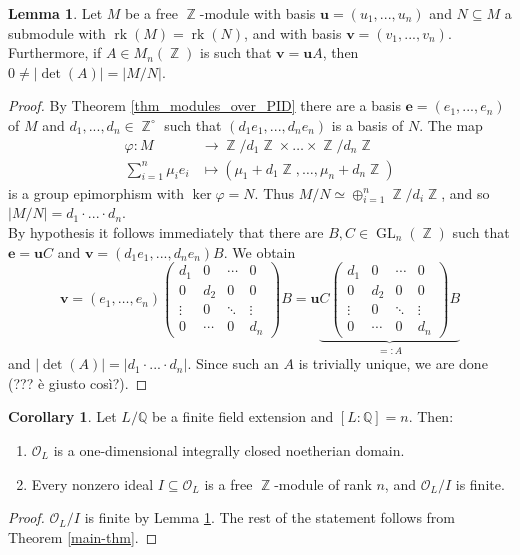 \documentclass[12pt,a4paper]{report}
\theoremstyle{definition}
\newtheorem{corollary}[theorem]{Corollary} %
\newtheorem{lemma}[theorem]{Lemma}
\theoremstyle{num.custom-title}
\DeclareMathOperator{\rk}{rk}
\DeclareMathOperator{\Z}{\mathbb{Z}}
\DeclareMathOperator{\sse}{\subseteq}
\DeclareMathOperator{\GL}{GL}
\newcommand{\Q}{\mathbb{Q}}
\renewcommand{\phi}{\varphi}
\renewcommand{\O}{\mathcal{O}}
\renewcommand{\u}{\mathbf{u}}
\begin{document}
\begin{lemma}\label{lemma_card_fact-mod}
Let $M$ be a free $\Z$-module with basis $\u = (u_1,...,u_n)$ and $N \sse M$ a submodule with $\rk(M) = \rk(N)$, and with basis $\mathbf{v} = (v_1,...,v_n)$. Furthermore, if $A \in M_n(\Z)$ is such that $\mathbf{v} = \u A$, then $0 \neq |\det(A)| = |M/N|$.
\begin{proof}
By Theorem \ref{thm_modules_over_PID} there are a basis $\mathbf{e} = (e_1,...,e_n)$ of $M$ and $d_1,...,d_n \in \Z^\circ$ such that $(d_1 e_1,...,d_n e_n)$ is a basis of $N$. The map
\begin{align*}
\phi \colon M &\to \Z/d_1\Z \times \ldots \times \Z/d_n\Z \\
\sum_{i=1}^n \mu_i e_i &\mapsto (\mu_1 + d_1\Z, \ldots, \mu_n + d_n\Z)
\end{align*}
is a group epimorphism with $\ker \phi = N$. Thus $M/N \simeq \oplus_{i=1}^n \Z/d_i\Z$, and so $|M/N| = d_1 \cdot ... \cdot d_n$.\\
By hypothesis it follows immediately that there are $B,C \in \GL_n(\Z)$ such that $\mathbf{e} = \mathbf{u} C$ and $\mathbf{v} = (d_1 e_1,...,d_n e_n)B$. We obtain
\[
\mathbf{v} = (e_1,\ldots,e_n)
\begin{pmatrix}
d_1 & 0 & \cdots & 0 \\
0 & d_2 & 0 & 0 \\
\vdots & 0 & \ddots & \vdots \\
0 & \cdots & 0 & d_n
\end{pmatrix}
B = \u \underbrace{C 
\begin{pmatrix}
d_1 & 0 & \cdots & 0 \\
0 & d_2 & 0 & 0 \\
\vdots & 0 & \ddots & \vdots \\
0 & \cdots & 0 & d_n
\end{pmatrix}
B}_{=:A}
\]
and $|\det(A)| = |d_1 \cdot ... \cdot d_n|$. Since such an $A$ is trivially unique, we are done (??? è giusto così?).
\end{proof}
\end{lemma}

\begin{corollary}
Let $L/\Q$ be a finite field extension and $[L:\Q]=n$. Then:
\begin{enumerate}
\item $\O_L$ is a one-dimensional integrally closed noetherian domain.
\item Every nonzero ideal $I \sse \O_L$ is a free $\Z$-module of rank $n$, and $\O_L/I$ is finite.
\end{enumerate}
\begin{proof}
$\O_L/I$ is finite by Lemma \ref{lemma_card_fact-mod}. The rest of the statement follows from Theorem \ref{main-thm}.
\end{proof}
\end{corollary}
\end{document}
